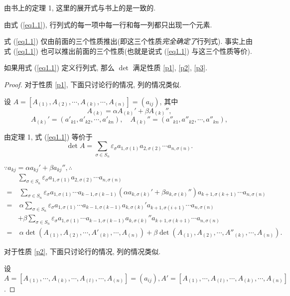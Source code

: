 \documentclass{ctexart}
\begin{document}
由书上的定理 1, 这里的展开式与书上的是一致的.

由式 (\ref{eq1.1}), 行列式的每一项中每一行和每一列都只出现一个元素.

式 (\ref{eq1.1}) 仅由前面的三个性质推出(即这三个性质\textit{完全确定了}行列式). 事实上由式 (\ref{eq1.1}) 也可以推出前面的三个性质(也就是说式 (\ref{eq1.1}) 与这三个性质等价).
\begin{theorem}
    如果用式 (\ref{eq1.1}) 定义行列式, 那么 $\det$ 满足性质 \ref{p1}, \ref{p2}, \ref{p3}.
\end{theorem}
\begin{proof}
    对于性质 \ref{p1}, 下面只讨论行的情况, 列的情况类似.

    设 $A=[A_{(1)},A_{(2)},\cdots,A_{(k)},\cdots,A_{(n)}]=(a_{ij})$, 其中
    \[A_{(k)}=\alpha A_{(k)}'+\beta A_{(k)}'',\]
    \[A_{(k)}'=(a'_{k1},a'_{k2},\cdots,a'_{kn}),\quad A_{(k)}''=(a''_{k1},a''_{k2},\cdots,a''_{kn}),\]

    由定理 1, 式 (\ref{eq1.1}) 等价于
    \[\det A=\sum\limits_{\sigma\in S_n}\varepsilon_\sigma a_{1,\sigma(1)}a_{2,\sigma(2)}\cdots a_{n,\sigma(n)}.\]

    $\because a_{kj}=\alpha a_{kj}'+\beta a_{kj}'',\therefore$
    \begin{align*}
        & \sum\limits_{\sigma\in S_n}\varepsilon_\sigma a_{1,\sigma(1)}a_{2,\sigma(2)}\cdots a_{n,\sigma(n)} \\
        = & \ \sum\limits_{\sigma\in S_n}\varepsilon_\sigma a_{1,\sigma(1)}\cdots a_{k-1,\sigma(k-1)}(\alpha a_{k,\sigma(k)}'+\beta a_{k,\sigma(k)}'')a_{k+1,\sigma(k+1)}\cdots a_{n,\sigma(n)} \\
        = & \ \alpha\sum\limits_{\sigma\in S_n}\varepsilon_\sigma a_{1,\sigma(1)}\cdots a_{k-1,\sigma(k-1)}a_{k,\sigma(k)}'a_{k+1,\sigma(i+1)}\cdots a_{n,\sigma(n)} \\
        & +\beta\sum\limits_{\sigma\in S_n}\varepsilon_\sigma a_{1,\sigma(1)}\cdots a_{k-1,\sigma(k-1)}a_{k,\sigma(k)}''a_{k+1,\sigma(k+1)}\cdots a_{n,\sigma(n)} \\
        = & \ \alpha\det(A_{(1)},A_{(2)},\cdots,A'_{(k)},\cdots,A_{(n)})+\beta\det(A_{(1)},A_{(2)},\cdots,A''_{(k)},\cdots,A_{(n)}).
    \end{align*}

    对于性质 \ref{p2}, 下面只讨论行的情况, 列的情况类似.

    设 $A=[A_{(1)},\cdots,A_{(k)},\cdots,A_{(l)},\cdots,A_{(n)}]=(a_{ij}),A'=[A_{(1)},\cdots,A_{(l)},\cdots,A_{(k)},\cdots,A_{(n)}]$.


\end{proof}
\end{document}

